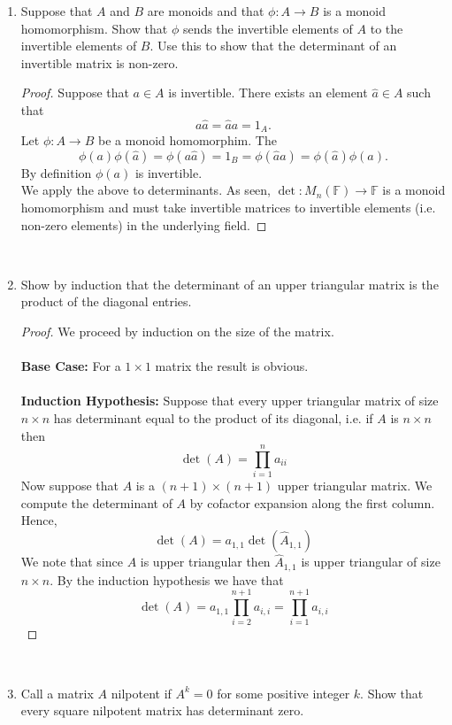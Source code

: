 \documentclass[12pt,letterpaper]{article}
\theoremstyle{plain}
\theoremstyle{definition}
\begin{document}
\begin{enumerate}[1.]
\item Suppose that $A$ and $B$ are monoids and that $\phi:A\rightarrow B$ is a monoid homomorphism. Show that $\phi$ sends the invertible elements of $A$ to the invertible elements of $B$. Use this to show that the determinant of an invertible matrix is non-zero. \\
\begin{proof}
Suppose that $a\in A$ is invertible. There exists an element $\hat{a}\in A$ such that 
\[a\hat{a}=\hat{a}a=1_A.\]
Let $\phi:A\rightarrow B$ be a monoid homomorphim. The 
\[\phi(a)\phi(\hat{a})=\phi(a\hat{a})=1_B=\phi(\hat{a}a)=\phi(\hat{a})\phi(a).\]
By definition $\phi(a)$ is invertible. \\
We apply the above to determinants. As seen, $\det:M_n(\mathbb{F})\rightarrow \mathbb{F}$ is a monoid homomorphism and must take invertible matrices to invertible elements (i.e. non-zero elements) in the underlying field. 
\end{proof}
\ \\
\item Show by induction that the determinant of an upper triangular matrix is the product of the diagonal entries. \\
\begin{proof} We proceed by induction on the size of the matrix.\\
\ \\
{\bf Base Case: }For a $1\times 1$ matrix the result is obvious. \\
\ \\
{\bf Induction Hypothesis: }Suppose that every upper triangular matrix of size $n\times n$ has determinant equal to the product of its diagonal, i.e. if $A$ is $n\times n$ then 
\[\det(A)=\prod_{i=1}^n a_{ii}\]
Now suppose that $A$ is a $(n+1)\times (n+1)$ upper triangular matrix. We compute the determinant of $A$ by cofactor expansion along the first column. 
Hence,
\[\det(A)=a_{1,1}\det(\hat{A}_{1,1})\]
We note that since $A$ is upper triangular then $\hat{A}_{1,1}$ is upper triangular of size $n\times n$. By the induction hypothesis we have that 
\[\det(A)=a_{1,1}\prod_{i=2}^{n+1}a_{i,i}=\prod_{i=1}^{n+1}a_{i,i}\]
\end{proof}
\ \\
\item Call a matrix $A$ nilpotent if $A^k=0$ for some positive integer $k$. Show that every square nilpotent matrix has determinant zero. \\

\end{enumerate}
\end{document}
